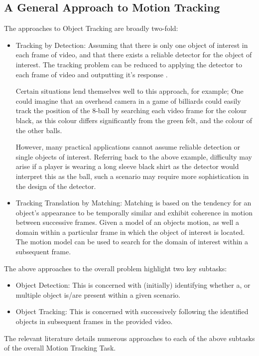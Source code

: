 \subsection{A General Approach to Motion Tracking}\label{literature_review_general_approach}
The approaches to Object Tracking are broadly two-fold:
\begin{itemize}
    \item Tracking by Detection:
        Assuming that there is only one object of interest in each frame of
        video, and that there exists a reliable detector for the object of
        interest. The tracking problem can be reduced to applying the detector
        to each frame of video and outputting it's response \cite{Forsyth2012}.

        Certain situations lend themselves well to this approach, for example;
        One could imagine that an overhead camera in a game of billiards could
        easily track the position of the 8-ball by searching each video frame
        for the colour black, as this colour differs significantly from the
        green felt, and the colour of the other balls.
        
        However, many practical applications cannot assume reliable detection or
        single objects of interest. Referring back to the above example,
        difficulty may arise if a player is wearing a long sleeve black shirt as
        the detector would interpret this as the ball, such a scenario may
        require more sophistication in the design of the detector.

    \item Tracking Translation by Matching:
        Matching is based on the tendency for an object's appearance to be
        temporally similar and exhibit coherence in motion between successive
        frames.
        Given a model of an objects motion, as well a domain within a particular
        frame in which the object of interest is located. The motion model can
        be used to search for the domain of interest within a subsequent frame.
        \cite{Forsyth2012}

\end{itemize}   

The above approaches to the overall problem highlight two key subtasks:
    \begin{itemize}
        \item Object Detection: This is concerned with (initially) identifying
            whether a, or multiple object is/are present within a given scenario.
        \item Object Tracking: This is concerned with successively following the
            identified objects in subsequent frames in the provided video.
    \end{itemize}
The relevant literature details numerous approaches to each of the above
subtasks of the overall Motion Tracking Task. 

